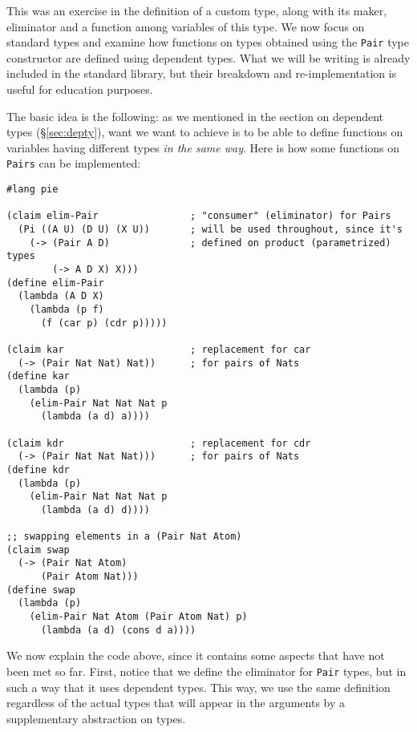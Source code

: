 
\vspace{0.3cm}

This was an exercise in the definition of a custom type, along with its
maker, eliminator and a function among variables of this type. We now focus
on standard types and examine how functions on types obtained using the
\texttt{Pair} type constructor are defined using dependent types.
What we will be writing is already included in the standard library, but their
breakdown and re-implementation is useful for education purposes.

The basic idea is the following: as we mentioned in the section on
dependent types (\S\ref{sec:depty}), want we want to achieve is to be able
to define functions on variables having different types \emph{in the same way}.
Here is how some functions on \texttt{Pairs} can be implemented:
{
  \small
\begin{verbatim}
#lang pie

(claim elim-Pair                ; "consumer" (eliminator) for Pairs
  (Pi ((A U) (D U) (X U))       ; will be used throughout, since it's
    (-> (Pair A D)              ; defined on product (parametrized) types
        (-> A D X) X)))
(define elim-Pair
  (lambda (A D X)
    (lambda (p f)
      (f (car p) (cdr p)))))

(claim kar                      ; replacement for car
  (-> (Pair Nat Nat) Nat))      ; for pairs of Nats
(define kar
  (lambda (p)
    (elim-Pair Nat Nat Nat p
      (lambda (a d) a))))

(claim kdr                      ; replacement for cdr
  (-> (Pair Nat Nat Nat)))      ; for pairs of Nats
(define kdr
  (lambda (p)
    (elim-Pair Nat Nat Nat p
      (lambda (a d) d))))

;; swapping elements in a (Pair Nat Atom)
(claim swap
  (-> (Pair Nat Atom)
      (Pair Atom Nat)))
(define swap
  (lambda (p)
    (elim-Pair Nat Atom (Pair Atom Nat) p)
      (lambda (a d) (cons d a))))
\end{verbatim}
}

We now explain the code above, since it contains some aspects that have not
been met so far. First, notice that we define the eliminator for \texttt{Pair}
types\footnotemark, but in such a way that it uses dependent types. This way,
we use the same definition regardless of the actual types that will appear in
the arguments by a supplementary abstraction on types.

